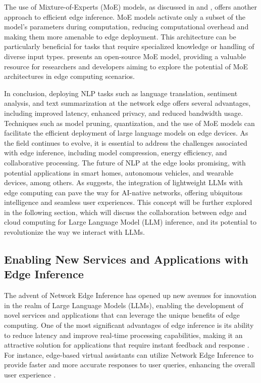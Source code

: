 \documentclass[11pt,a4paper]{article}
\begin{document}
The use of Mixture-of-Experts (MoE) models, as discussed in \cite{arxiv:1701.06538} and \cite{doi:10.18653/v1/2022.emnlp-main.804}, offers another approach to efficient edge inference. MoE models activate only a subset of the model's parameters during computation, reducing computational overhead and making them more amenable to edge deployment. This architecture can be particularly beneficial for tasks that require specialized knowledge or handling of diverse input types. \cite{arxiv:2402.01739} presents an open-source MoE model, providing a valuable resource for researchers and developers aiming to explore the potential of MoE architectures in edge computing scenarios.

In conclusion, deploying NLP tasks such as language translation, sentiment analysis, and text summarization at the network edge offers several advantages, including improved latency, enhanced privacy, and reduced bandwidth usage. Techniques such as model pruning, quantization, and the use of MoE models can facilitate the efficient deployment of large language models on edge devices. As the field continues to evolve, it is essential to address the challenges associated with edge inference, including model compression, energy efficiency, and collaborative processing. The future of NLP at the edge looks promising, with potential applications in smart homes, autonomous vehicles, and wearable devices, among others. As \cite{doi:10.1109/meditcom61057.2024.10621076} suggests, the integration of lightweight LLMs with edge computing can pave the way for AI-native networks, offering ubiquitous intelligence and seamless user experiences. This concept will be further explored in the following section, which will discuss the collaboration between edge and cloud computing for Large Language Model (LLM) inference, and its potential to revolutionize the way we interact with LLMs.


\subsection{Enabling New Services and Applications with Edge Inference}


The advent of Network Edge Inference has opened up new avenues for innovation in the realm of Large Language Models (LLMs), enabling the development of novel services and applications that can leverage the unique benefits of edge computing. One of the most significant advantages of edge inference is its ability to reduce latency and improve real-time processing capabilities, making it an attractive solution for applications that require instant feedback and response \cite{arxiv:2112.06905}. For instance, edge-based virtual assistants can utilize Network Edge Inference to provide faster and more accurate responses to user queries, enhancing the overall user experience \cite{arxiv:2307.06148}.
\end{document}

